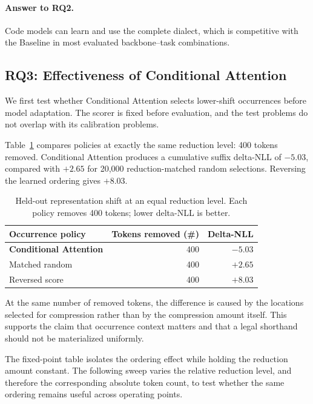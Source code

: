 \paragraph{Answer to RQ2.} Code models can learn and use the complete \tool dialect, which is competitive with the Baseline in most evaluated backbone--task combinations.

\subsection{RQ3: Effectiveness of Conditional Attention}
\label{subsec:rq3}

We first test whether Conditional Attention selects lower-shift occurrences before model adaptation. The scorer is fixed before evaluation, and the test problems do not overlap with its calibration problems.

Table~\ref{tab:conditional_attention_shift} compares policies at exactly the same reduction level: 400 tokens removed. Conditional Attention produces a cumulative suffix delta-NLL of $-5.03$, compared with $+2.65$ for 20,000 reduction-matched random selections. Reversing the learned ordering gives $+8.03$.

\begin{table}[H]
    \centering
    \small
    \setlength{\tabcolsep}{6pt}
    \renewcommand{\arraystretch}{1.08}
    \caption{Held-out representation shift at an equal reduction level. Each policy removes 400 tokens; lower delta-NLL is better.}
    \vspace{-5pt}
    \label{tab:conditional_attention_shift}
    \begin{tabular}{@{}lrr@{}}
    \toprule
    \textbf{Occurrence policy} & \textbf{Tokens removed (\#)} & \textbf{Delta-NLL} \\
    \midrule
    \textbf{Conditional Attention} & 400 & $\mathbf{-5.03}$ \\
    Matched random & 400 & $+2.65$ \\
    Reversed score & 400 & $+8.03$ \\
    \bottomrule
    \end{tabular}
\end{table}

At the same number of removed tokens, the difference is caused by the locations selected for compression rather than by the compression amount itself. This supports the claim that occurrence context matters and that a legal shorthand should not be materialized uniformly.

The fixed-point table isolates the ordering effect while holding the reduction amount constant. The following sweep varies the relative reduction level, and therefore the corresponding absolute token count, to test whether the same ordering remains useful across operating points.

